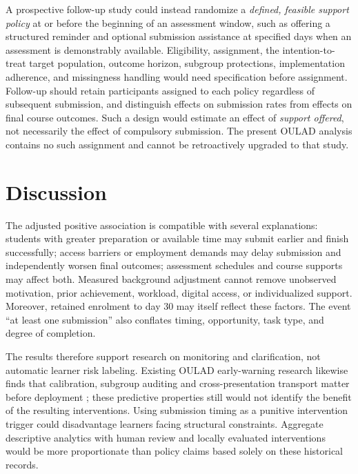 \documentclass[10pt,a4paper]{article}
\begin{document}
A prospective follow-up study could instead randomize a \emph{defined, feasible support policy} at or before the beginning of an assessment window, such as offering a structured reminder and optional submission assistance at specified days when an assessment is demonstrably available. Eligibility, assignment, the intention-to-treat target population, outcome horizon, subgroup protections, implementation adherence, and missingness handling would need specification before assignment. Follow-up should retain participants assigned to each policy regardless of subsequent submission, and distinguish effects on submission rates from effects on final course outcomes. Such a design would estimate an effect of \emph{support offered}, not necessarily the effect of compulsory submission. The present OULAD analysis contains no such assignment and cannot be retroactively upgraded to that study.

\section{Discussion}
The adjusted positive association is compatible with several explanations: students with greater preparation or available time may submit earlier and finish successfully; access barriers or employment demands may delay submission and independently worsen final outcomes; assessment schedules and course supports may affect both. Measured background adjustment cannot remove unobserved motivation, prior achievement, workload, digital access, or individualized support. Moreover, retained enrolment to day 30 may itself reflect these factors. The event ``at least one submission'' also conflates timing, opportunity, task type, and degree of completion.

The results therefore support research on monitoring and clarification, not automatic learner risk labeling. Existing OULAD early-warning research likewise finds that calibration, subgroup auditing and cross-presentation transport matter before deployment \citep{wu2026}; these predictive properties still would not identify the benefit of the resulting interventions. Using submission timing as a punitive intervention trigger could disadvantage learners facing structural constraints. Aggregate descriptive analytics with human review and locally evaluated interventions would be more proportionate than policy claims based solely on these historical records.
\end{document}
